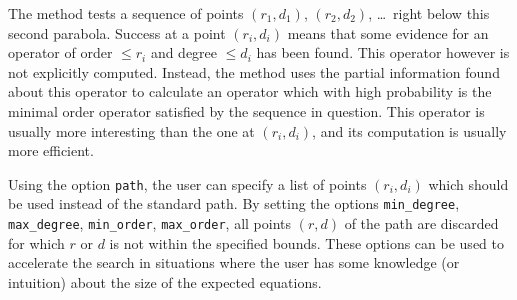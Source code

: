 \documentclass{amsart}
\begin{document}
The method tests a sequence of points $(r_1,d_1)$, $(r_2,d_2)$, \dots\ right
below this second parabola. Success at a point $(r_i,d_i)$ means that some
evidence for an operator of order $\leq r_i$ and degree $\leq d_i$ has been found. 
This operator however is not explicitly computed. Instead, the method uses the
partial information found about this operator to calculate an operator which with 
high probability is the minimal order operator satisfied by the sequence in question. 
This operator is usually more interesting than the one at $(r_i,d_i)$, and its 
computation is usually more efficient. 

Using the option \verb|path|, the user can specify a list of points $(r_i,d_i)$
which should be used instead of the standard path. By setting the options \verb|min_degree|,
\verb|max_degree|, \verb|min_order|, \verb|max_order|, all points $(r,d)$ of the path
are discarded for which $r$ or $d$ is not within the specified bounds. These options
can be used to accelerate the search in situations where the user has some knowledge
(or intuition) about the size of the expected equations. 
\end{document}

